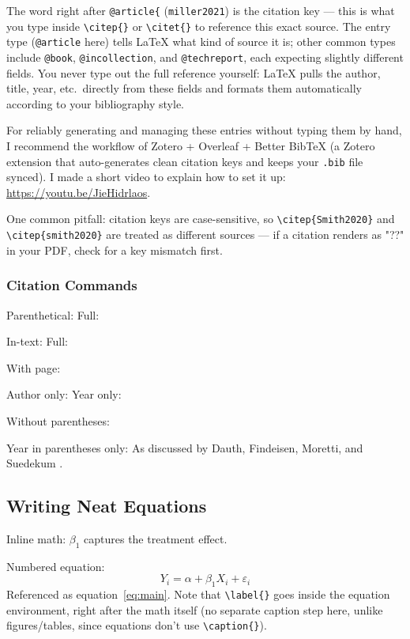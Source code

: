 The word right after \texttt{@article\{} (\texttt{miller2021}) is the citation key --- this is what you type inside \verb|\citep{}| or \verb|\citet{}| to reference this exact source. The entry type (\texttt{@article} here) tells LaTeX what kind of source it is; other common types include \texttt{@book}, \texttt{@incollection}, and \texttt{@techreport}, each expecting slightly different fields. You never type out the full reference yourself: LaTeX pulls the author, title, year, etc.\ directly from these fields and formats them automatically according to your bibliography style.

For reliably generating and managing these entries without typing them by hand, I recommend the workflow of Zotero + Overleaf + Better BibTeX (a Zotero extension that auto-generates clean citation keys and keeps your \texttt{.bib} file synced). I made a short video to explain how to set it up: \url{https://youtu.be/JieHidrlaos}. 

One common pitfall: citation keys are case-sensitive, so \verb|\citep{Smith2020}| and \verb|\citep{smith2020}| are treated as different sources --- if a citation renders as "??" in your PDF, check for a key mismatch first.

\subsubsection*{Citation Commands}

Parenthetical: \citep{dauthMatchingCities2022} \quad Full: \citep*{dauthMatchingCities2022}

In-text: \citet{dauthMatchingCities2022} \quad Full: \citet*{dauthMatchingCities2022}

With page: \citep[p.\ 220]{dauthMatchingCities2022}

Author only: \citeauthor{dauthMatchingCities2022} \quad Year only: \citeyear{dauthMatchingCities2022}

Without parentheses: \citealt{dauthMatchingCities2022}

Year in parentheses only: As discussed by Dauth, Findeisen, Moretti, and Suedekum \citeyearpar{dauthMatchingCities2022}.

\subsection*{Writing Neat Equations}

Inline math: \(\beta_1\) captures the treatment effect.

Numbered equation:
\begin{equation}
    Y_i = \alpha + \beta_1 X_i + \varepsilon_i
    \label{eq:main}
\end{equation}
Referenced as equation~\ref{eq:main}. Note that \verb|\label{}| goes inside the equation environment, right after the math itself (no separate caption step here, unlike figures/tables, since equations don't use \verb|\caption{}|).

